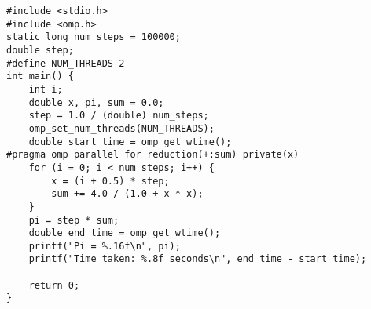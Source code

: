 \documentclass{article}
\begin{document}
\begin{lstlisting}[style=cstyle,caption={并行$\pi$值计算4}]
#include <stdio.h>
#include <omp.h>
static long num_steps = 100000;
double step;
#define NUM_THREADS 2
int main() {
    int i;
    double x, pi, sum = 0.0;
    step = 1.0 / (double) num_steps;
    omp_set_num_threads(NUM_THREADS);
    double start_time = omp_get_wtime();
#pragma omp parallel for reduction(+:sum) private(x)
    for (i = 0; i < num_steps; i++) {
        x = (i + 0.5) * step;
        sum += 4.0 / (1.0 + x * x);
    }
    pi = step * sum;
    double end_time = omp_get_wtime();
    printf("Pi = %.16f\n", pi);
    printf("Time taken: %.8f seconds\n", end_time - start_time);

    return 0;
}
\end{lstlisting}
\end{document}
